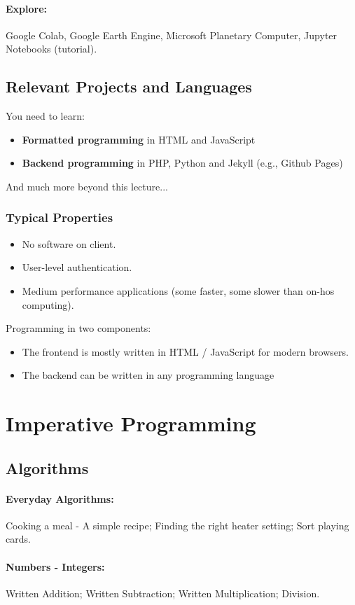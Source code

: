 \documentclass[twocolumn]{article}
\begin{document}
		\paragraph{Explore:}
			Google Colab, Google Earth Engine, Microsoft Planetary Computer, Jupyter Notebooks (tutorial).
		\subsection{Relevant Projects and Languages}
			You need to learn:
			\begin{itemize}
			\item \textbf{Formatted programming} in HTML and JavaScript
			\item \textbf{Backend programming} in PHP, Python and Jekyll (e.g., Github Pages)
			\end{itemize}
			And much more beyond this lecture...
		\subsubsection{Typical Properties}
			\begin{itemize}
			\item No software on client.
			\item User-level authentication.
			\item Medium performance applications (some faster, some slower than on-hos computing).
			\end{itemize}	
			Programming in two components:
			\begin{itemize}
			\item The frontend is mostly written in HTML / JavaScript for modern browsers.
			\item The backend can be written in any programming language
			\end{itemize}
\section{Imperative Programming}
	\subsection{Algorithms}
		\paragraph{Everyday Algorithms:}
			Cooking a meal - A simple recipe; Finding the right heater setting; Sort playing cards.
		\paragraph{Numbers - Integers:}
			Written Addition; Written Subtraction; Written Multiplication; Division.
\end{document}
